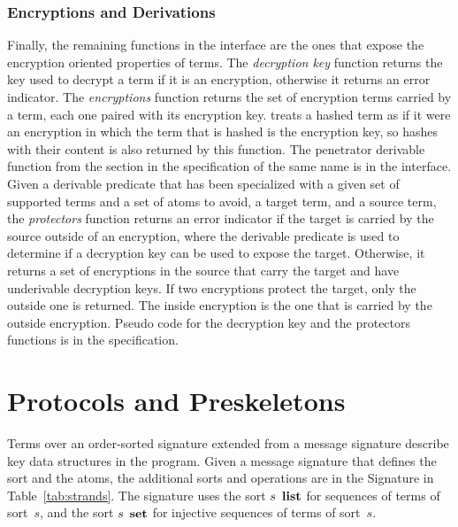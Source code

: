 \documentclass[12pt]{report}
\theoremstyle{definition}
\begin{document}
\subsection{Encryptions and Derivations}\label{sec:encryptions}

Finally, the remaining functions in the interface are the ones that
expose the encryption oriented properties of terms.  The
\emph{decryption key} function returns the key used to decrypt a term
if it is an encryption, otherwise it returns an error indicator.  The
\emph{encryptions} function returns the set of encryption terms
carried by a term, each one paired with its encryption key.  {\cpsa}
treats a hashed term as if it were an encryption in which the term
that is hashed is the encryption key, so hashes with their content is
also returned by this function.  The penetrator derivable function
from the section in the specification of the same name is in the
interface.  Given a derivable predicate that has been specialized with
a given set of supported terms and a set of atoms to avoid, a target
term, and a source term, the \emph{protectors} function returns an
error indicator if the target is carried by the source outside of an
encryption, where the derivable predicate is used to determine if a
decryption key can be used to expose the target.  Otherwise, it
returns a set of encryptions in the source that carry the target and
have underivable decryption keys.  If two encryptions protect the
target, only the outside one is returned.  The inside encryption is
the one that is carried by the outside encryption.  Pseudo code for
the decryption key and the protectors functions is in the
specification.

\chapter{Protocols and Preskeletons}\label{cha:prots and preskels}

Terms over an order-sorted signature extended from a message signature
describe key data structures in the {\cpsa} program.  Given a message
signature that defines the sort  and the atoms, the
additional sorts and operations are in the {\cpsa} Signature in
Table~\ref{tab:strands}.  The signature uses the sort $s~\operatorname{\mathbf{list}}$
for sequences of terms of sort~$s$, and the sort $s~\operatorname{\mathbf{set}}$ for
injective sequences of terms of sort~$s$.
\end{document}

